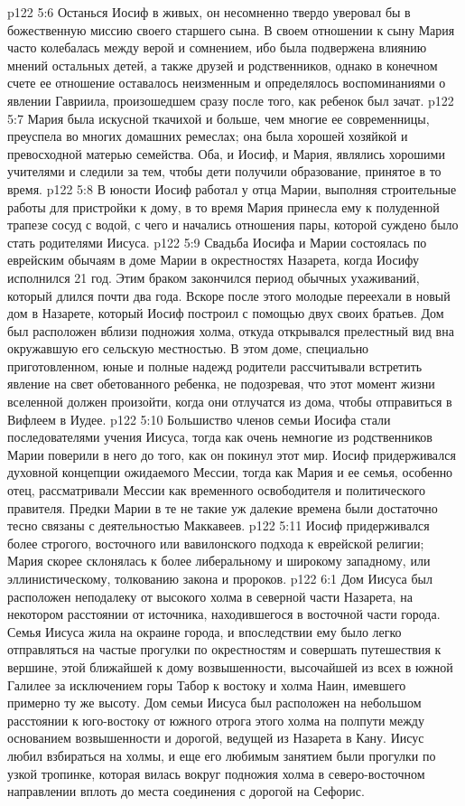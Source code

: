 \vs p122 5:6 Останься Иосиф в живых, он несомненно твердо уверовал бы в божественную миссию своего старшего сына. В своем отношении к сыну Мария часто колебалась между верой и сомнением, ибо была подвержена влиянию мнений остальных детей, а также друзей и родственников, однако в конечном счете ее отношение оставалось неизменным и определялось воспоминаниями о явлении Гавриила, произошедшем сразу после того, как ребенок был зачат.
\vs p122 5:7 Мария была искусной ткачихой и больше, чем многие ее современницы, преуспела во многих домашних ремеслах; она была хорошей хозяйкой и превосходной матерью семейства. Оба, и Иосиф, и Мария, являлись хорошими учителями и следили за тем, чтобы дети получили образование, принятое в то время.
\vs p122 5:8 \pc В юности Иосиф работал у отца Марии, выполняя строительные работы для пристройки к дому, в то время Мария принесла ему к полуденной трапезе сосуд с водой, с чего и начались отношения пары, которой суждено было стать родителями Иисуса.
\vs p122 5:9 Свадьба Иосифа и Марии состоялась по еврейским обычаям в доме Марии в окрестностях Назарета, когда Иосифу исполнился 21 год. Этим браком закончился период обычных ухаживаний, который длился почти два года. Вскоре после этого молодые переехали в новый дом в Назарете, который Иосиф построил с помощью двух своих братьев. Дом был расположен вблизи подножия холма, откуда открывался прелестный вид вна окружавшую его сельскую местностью. В этом доме, специально приготовленном, юные и полные надежд родители рассчитывали встретить явление на свет обетованного ребенка, не подозревая, что этот момент жизни вселенной должен произойти, когда они отлучатся из дома, чтобы отправиться в Вифлеем в Иудее.
\vs p122 5:10 \pc Большиство членов семьи Иосифа стали последователями учения Иисуса, тогда как очень немногие из родственников Марии поверили в него до того, как он покинул этот мир. Иосиф придерживался духовной концепции ожидаемого Мессии, тогда как Мария и ее семья, особенно отец, рассматривали Мессии как временного освободителя и политического правителя. Предки Марии в те не такие уж далекие времена были достаточно тесно связаны с деятельностью Маккавеев.
\vs p122 5:11 Иосиф придерживался более строгого, восточного или вавилонского подхода к еврейской религии; Мария скорее склонялась к более либеральному и широкому западному, или эллинистическому, толкованию закона и пророков.
\vs p122 6:1 Дом Иисуса был расположен неподалеку от высокого холма в северной части Назарета, на некотором расстоянии от источника, находившегося в восточной части города. Семья Иисуса жила на окраине города, и впоследствии ему было легко отправляться на частые прогулки по окрестностям и совершать путешествия к вершине, этой ближайшей к дому возвышенности, высочайшей из всех в южной Галилее за исключением горы Табор к востоку и холма Наин, имевшего примерно ту же высоту. Дом семьи Иисуса был расположен на небольшом расстоянии к юго\hyp{}востоку от южного отрога этого холма на полпути между основанием возвышенности и дорогой, ведущей из Назарета в Кану. Иисус любил взбираться на холмы, и еще его любимым занятием были прогулки по узкой тропинке, которая вилась вокруг подножия холма в северо\hyp{}восточном направлении вплоть до места соединения с дорогой на Сефорис.
